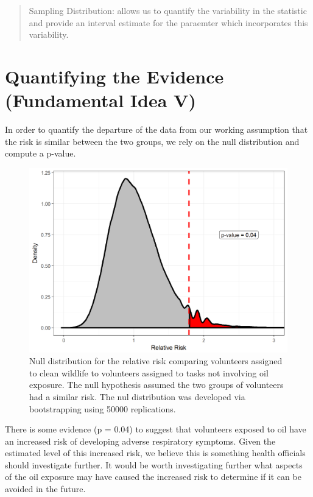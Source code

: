 \documentclass[]{book}
\theoremstyle{definition}
\theoremstyle{definition}
\theoremstyle{remark}
\begin{document}
\begin{quote}
Sampling Distribution: allows us to quantify the variability in the
statistic and provide an interval estimate for the paraemter which
incorporates this variability.
\end{quote}

\section{Quantifying the Evidence (Fundamental Idea
V)}\label{quantifying-the-evidence-fundamental-idea-v}

In order to quantify the departure of the data from our working
assumption that the risk is similar between the two groups, we rely on
the null distribution and compute a p-value.

\begin{figure}

{\centering \includegraphics[width=0.8\linewidth]{./Images/recaplanguage-null-distribution-1} 

}

\caption{Null distribution for the relative risk comparing volunteers assigned to clean wildlife to volunteers assigned to tasks not involving oil exposure.  The null hypothesis assumed the two groups of volunteers had a similar risk.  The nul distribution was developed via bootstrapping using 50000 replications.}\label{fig:recaplanguage-null-distribution}
\end{figure}

There is some evidence (p = 0.04) to suggest that volunteers exposed to
oil have an increased risk of developing adverse respiratory symptoms.
Given the estimated level of this increased risk, we believe this is
something health officials should investigate further. It would be worth
investigating further what aspects of the oil exposure may have caused
the increased risk to determine if it can be avoided in the future.
\end{document}
